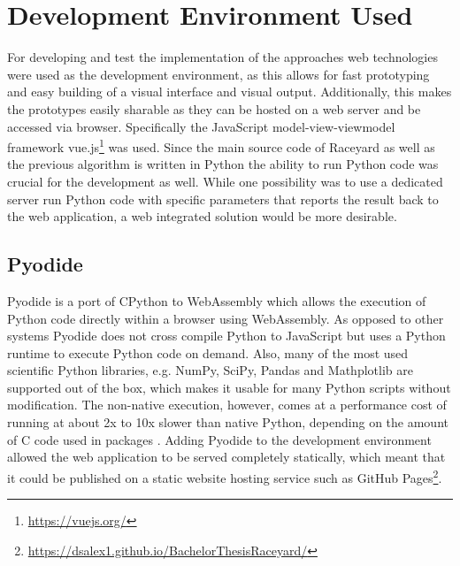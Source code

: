 \section{Development Environment Used}
For developing and test the implementation of the approaches web technologies were used as the development environment, as this allows for fast prototyping and easy building of a visual interface and visual output. Additionally, this makes the prototypes easily sharable as they can be hosted on a web server and be accessed via browser. Specifically the JavaScript model-view-viewmodel framework vue.js\footnote{\url{https://vuejs.org/}} was used. Since the main source code of Raceyard as well as the previous algorithm is written in Python the ability to run Python code was crucial for the development as well. While one possibility was to use a dedicated server run Python code with specific parameters that reports the result back to the web application, a web integrated solution would be more desirable.

\subsection{Pyodide}
Pyodide is a port of CPython to WebAssembly \cite{pyodide} which allows the execution of Python code directly within a browser using WebAssembly. As opposed to other systems Pyodide does not cross compile Python to JavaScript but uses a Python runtime to execute Python code on demand. Also, many of the most used scientific Python libraries, e.g. NumPy, SciPy, Pandas and Mathplotlib are supported out of the box, which makes it usable for many Python scripts without modification. The non-native execution, however, comes at a performance cost of running at about 2x to 10x slower than native Python, depending on the amount of C code used in packages \cite{pyodide2021}\cite{Jangda2019}. Adding Pyodide to the development environment allowed the web application to be served completely statically, which meant that it could be published on a static website hosting service such as GitHub Pages\footnote{\url{https://dsalex1.github.io/BachelorThesisRaceyard/}}.